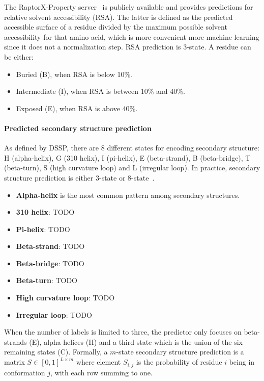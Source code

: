             The RaptorX-Property server~\cite{wang2016raptorx} is publicly available and provides
            predictions for relative solvent accessibility (RSA). The latter is defined as the predicted
            accessible surface of a residue divided by the maximum possible solvent accessibility
            for that amino acid, which is more convenient more machine learning since it does not a
            normalization step. RSA prediction is 3-state. A residue can be either:
            \begin{itemize}
                \item Buried (B), when RSA is below 10\%.
                \item Intermediate (I), when RSA is between 10\% and 40\%.
                \item Exposed (E), when RSA is above 40\%.
            \end{itemize}


        \paragraph{Predicted secondary structure prediction}

            As defined by DSSP, there are 8 different states for encoding
            secondary structure: H (alpha-helix),
            G (310 helix), I (pi-helix), E (beta-strand), B (beta-bridge),
            T (beta-turn), S (high curvature loop) and L (irregular loop).
            In practice, secondary structure prediction is either 3-state
            or 8-state~\cite{wang2016raptorx}.
            \begin{itemize}
                \item \textbf{Alpha-helix} is the most common pattern among
                    secondary structures.
                \item \textbf{310 helix}:  TODO
                \item \textbf{Pi-helix}: TODO
                \item \textbf{Beta-strand}: TODO
                \item \textbf{Beta-bridge}: TODO
                \item \textbf{Beta-turn}: TODO
                \item \textbf{High curvature loop}: TODO
                \item \textbf{Irregular loop}: TODO
            \end{itemize}

            When the number of labels is limited to three,
            the predictor only focuses on beta-strands (E), alpha-helices (H)
            and a third state which is the union of the six remaining states (C).
            Formally, a $m$-state secondary structure prediction is a matrix
            $S \in [0, 1]^{L \times m}$ where element $S_{i,j}$ is the probability
            of residue $i$ being in conformation $j$,
            with each row summing to one.

